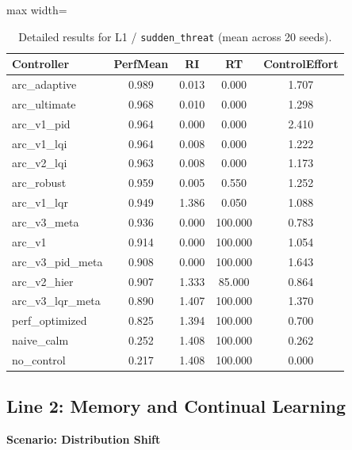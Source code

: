 \documentclass{article}
\newcommand{\scenarioheader}[1]{\Needspace{20\baselineskip}\textbf{Scenario: #1}}
\begin{document}
\begin{table}[H]
\centering
\footnotesize
\caption{Detailed results for L1 / \texttt{sudden\_threat} (mean across 20 seeds).}
\label{tab:g3_sudden_threat}
\begin{adjustbox}{max width=\textwidth}
\begin{tabular}{@{}lcccc@{}}
\toprule
Controller & PerfMean & RI & RT & ControlEffort \\ \midrule
arc\_adaptive & 0.989 & 0.013 & 0.000 & 1.707 \\
arc\_ultimate & 0.968 & 0.010 & 0.000 & 1.298 \\
arc\_v1\_pid & 0.964 & 0.000 & 0.000 & 2.410 \\
arc\_v1\_lqi & 0.964 & 0.008 & 0.000 & 1.222 \\
arc\_v2\_lqi & 0.963 & 0.008 & 0.000 & 1.173 \\
arc\_robust & 0.959 & 0.005 & 0.550 & 1.252 \\
arc\_v1\_lqr & 0.949 & 1.386 & 0.050 & 1.088 \\
arc\_v3\_meta & 0.936 & 0.000 & 100.000 & 0.783 \\
arc\_v1 & 0.914 & 0.000 & 100.000 & 1.054 \\
arc\_v3\_pid\_meta & 0.908 & 0.000 & 100.000 & 1.643 \\
arc\_v2\_hier & 0.907 & 1.333 & 85.000 & 0.864 \\
arc\_v3\_lqr\_meta & 0.890 & 1.407 & 100.000 & 1.370 \\
perf\_optimized & 0.825 & 1.394 & 100.000 & 0.700 \\
naive\_calm & 0.252 & 1.408 & 100.000 & 0.262 \\
no\_control & 0.217 & 1.408 & 100.000 & 0.000 \\ \bottomrule
\end{tabular}
\end{adjustbox}
\end{table}

\FloatBarrier
\subsection{Line 2: Memory and Continual Learning}

\scenarioheader{Distribution Shift}
\end{document}
